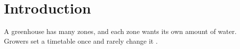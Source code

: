 \documentclass[main.tex]{subfiles}
\begin{document}
\section{Introduction}
A greenhouse has many zones, and each zone wants its own amount of water.
Growers set a timetable once and rarely change it \autocite{lund21}.
\end{document}
